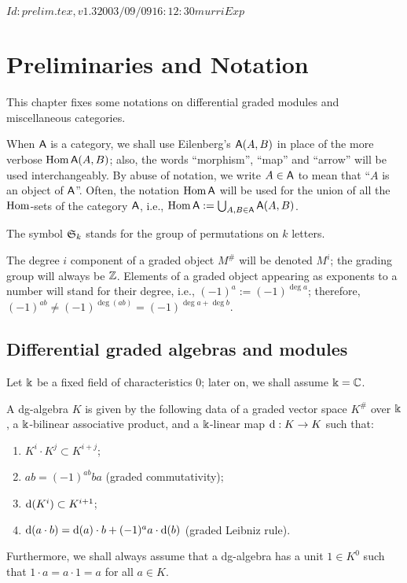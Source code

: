 \RCSID $Id: prelim.tex,v 1.3 2003/09/09 16:12:30 murri Exp $


\chapter{Preliminaries and Notation}

This chapter fixes some notations on differential graded modules
and miscellaneous categories. 

When $\mathsf{A}$ is a category, we shall use Eilenberg's $\mathsf{A}(A, B)$ in place
of the more verbose $\operatorname{Hom} \mathsf{A}(A, B)$; also, the words ``morphism'',
``map'' and ``arrow'' will be used interchangeably. By abuse of
notation, we write $A \in \mathsf{A}$ to mean that ``$A$ is an object of
$\mathsf{A}$''. Often, the notation $\operatorname{Hom}\mathsf{A}$ will be used for the union of all
the $\operatorname{Hom}$-sets of the category $\mathsf{A}$, i.e., $\operatorname{Hom}\mathsf{A} := \bigcup_{A,B \in \mathsf{A}}
\mathsf{A}(A,B)$.

The symbol $\mathfrak{S}_{k}$ stands for the group of permutations on $k$
letters.

The degree $i$ component of a graded object $M^\#$ will be denoted
$M^i$; the grading group will always be $\mathbb{Z}$. Elements of a graded
object appearing as exponents to a number will stand for their degree,
i.e., $(-1)^a := (-1)^{\deg a}$; therefore, $(-1)^{ab} \not=
(-1)^{\deg (ab)} = (-1)^{\deg a + \deg b}$.


\section{Differential graded algebras and modules}
\label{sec:dg-things}

Let $\Bbbk$ be a fixed field of characteristics $0$; later on, we shall
assume $\Bbbk = \mathbb{C}$.
\begin{definition}
  A dg-algebra $K$ is given by the following data of a graded vector
  space $K^\#$ over $\Bbbk$, a $\Bbbk$-bilinear associative product, and a
  $\Bbbk$-linear map $\mathrm{d}: K\to K$ such that:
  \begin{enumerate}
  \item $K^i \cdot K^j \subset K^{i+j}$;
  \item $ab = (-1)^{ab} ba$ (graded commutativity);
  \item $\mathrm{d}(K^i) \subset K^{i+1}$;
  \item $\mathrm{d}(a\cdot b) = \mathrm{d}(a)\cdot b + (-1)^a a\cdot\mathrm{d}(b)$ (graded Leibniz rule).
  \end{enumerate}
  Furthermore, we shall always assume that a dg-algebra has a unit
  $1\in K^0$ such that $1\cdot a = a\cdot 1 = a$ for all $a\in
  K$.
\end{definition}

